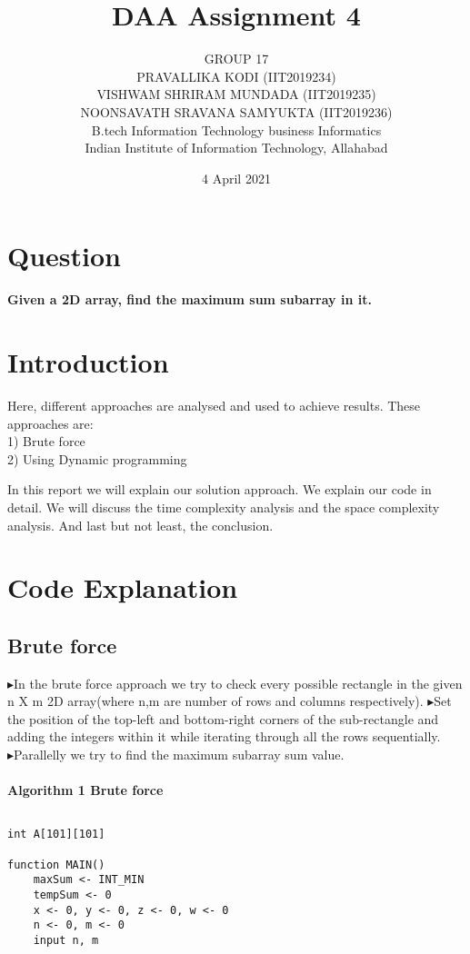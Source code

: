 \documentclass[12pt, a4paper]{report}
\title{DAA Assignment 4}
\author{GROUP 17\\
PRAVALLIKA KODI
 (IIT2019234)\\ 
VISHWAM SHRIRAM MUNDADA
 (IIT2019235)\\ 
NOONSAVATH SRAVANA SAMYUKTA
 (IIT2019236)\\
B.tech Information Technology business Informatics\\
Indian Institute of Information Technology, Allahabad}
\date{4 April 2021}
\begin{document}
\maketitle

\begin{multicols}{2}
\section{Question}

\textbf{Given a 2D array, find the maximum sum subarray in it.}





\section{Introduction}
Here, different approaches are analysed and used to achieve results.
These approaches are:\\
1) Brute force\\
2) Using Dynamic programming
 


In this report we will explain our solution approach. We explain our code in detail. We will discuss the time complexity analysis and the space complexity analysis. And last but not least, the conclusion.



\section{Code Explanation}
\subsection{Brute force}

▸In the brute force approach we try to check every possible rectangle in the given
n X m 2D array(where n,m are number of rows and columns respectively).
▸Set the position of the top-left and bottom-right corners of the sub-rectangle and
adding the integers within it while iterating through all the rows sequentially.
▸Parallelly we try to find the maximum subarray sum value.\\
\hline\\
\textbf{Algorithm 1 Brute force}

\begin{lstlisting}

int A[101][101]

function MAIN()
	maxSum <- INT_MIN
	tempSum <- 0
	x <- 0, y <- 0, z <- 0, w <- 0
	n <- 0, m <- 0
	input n, m


\end{lstlisting}
\end{multicols}
\end{document}
